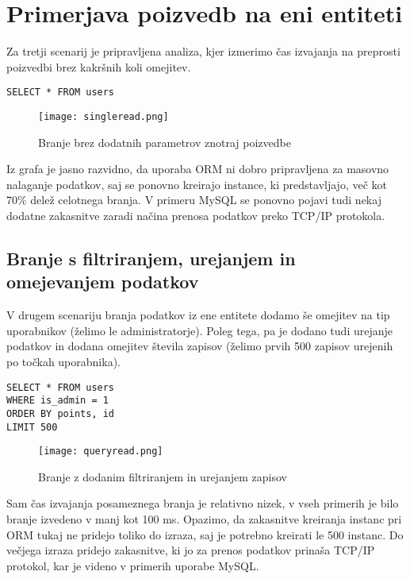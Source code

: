 \documentclass[a4paper,12pt,openright]{book}
\begin{document}
    \section{Primerjava poizvedb na eni entiteti}

    Za tretji scenarij je pripravljena analiza, kjer izmerimo čas izvajanja na preprosti poizvedbi brez kakršnih koli omejitev.
    
\begin{verbatim}
SELECT * FROM users
\end{verbatim}
    

    \begin{figure}[H]
        \centerline{\texttt{[image: singleread.png]}}
        \caption{Branje brez dodatnih parametrov znotraj poizvedbe}
        \label{branje}
    \end{figure}

    \noindent
    Iz grafa je jasno razvidno, da uporaba ORM ni dobro pripravljena za masovno nalaganje podatkov, saj se ponovno kreirajo instance, ki predstavljajo, več kot 70\% delež celotnega branja. V primeru MySQL se ponovno pojavi tudi nekaj dodatne zakasnitve zaradi načina prenosa podatkov preko TCP/IP protokola.

    \subsection{Branje s filtriranjem, urejanjem in omejevanjem podatkov}

    V drugem scenariju branja podatkov iz ene entitete dodamo še omejitev na tip uporabnikov (želimo le administratorje). Poleg tega, pa je dodano tudi urejanje podatkov in dodana omejitev števila zapisov (želimo prvih 500 zapisov urejenih po točkah uporabnika).

\begin{verbatim}
SELECT * FROM users
WHERE is_admin = 1
ORDER BY points, id
LIMIT 500
\end{verbatim}
    
    \begin{figure}[H]
        \centerline{\texttt{[image: queryread.png]}}
        \caption{Branje z dodanim filtriranjem in urejanjem zapisov}
        \label{queryread}
    \end{figure}

    \noindent
    Sam čas izvajanja posameznega branja je relativno nizek, v vseh primerih je bilo branje izvedeno v manj kot 100 ms. Opazimo, da zakasnitve kreiranja instanc pri ORM tukaj ne pridejo toliko do izraza, saj je potrebno kreirati le 500 instanc. Do večjega izraza pridejo zakasnitve, ki jo za prenos podatkov prinaša TCP/IP protokol, kar je videno v primerih uporabe MySQL.
\end{document}
